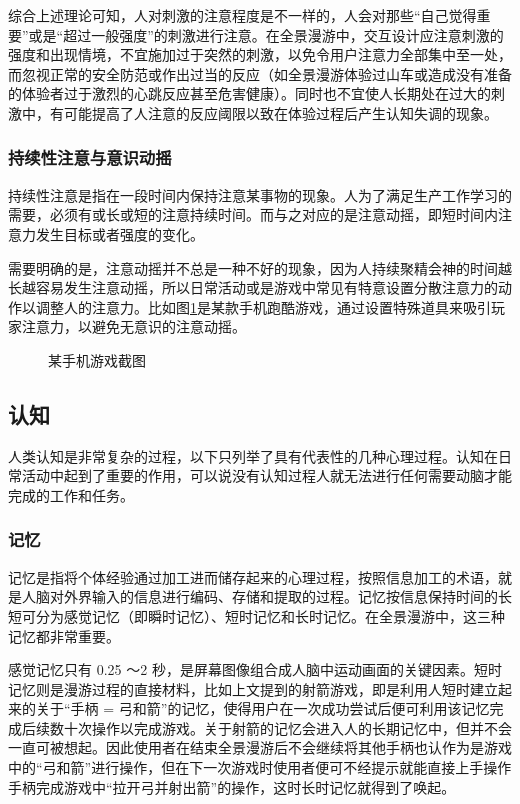 综合上述理论可知，人对刺激的注意程度是不一样的，人会对那些“自己觉得重要”或是“超过一般强度”的刺激进行注意。在全景漫游中，交互设计应注意刺激的强度和出现情境，不宜施加过于突然的刺激，以免令用户注意力全部集中至一处，而忽视正常的安全防范或作出过当的反应（如全景漫游体验过山车或造成没有准备的体验者过于激烈的心跳反应甚至危害健康）。同时也不宜使人长期处在过大的刺激中，有可能提高了人注意的反应阈限以致在体验过程后产生认知失调的现象。

\subsubsection{持续性注意与意识动摇}
持续性注意是指在一段时间内保持注意某事物的现象。人为了满足生产工作学习的需要，必须有或长或短的注意持续时间。而与之对应的是注意动摇，即短时间内注意力发生目标或者强度的变化。

需要明确的是，注意动摇并不总是一种不好的现象，因为人持续聚精会神的时间越长越容易发生注意动摇，所以日常活动或是游戏中常见有特意设置分散注意力的动作以调整人的注意力。比如图\ref{fig:magnet}是某款手机跑酷游戏，通过设置特殊道具来吸引玩家注意力，以避免无意识的注意动摇。

\begin{figure}[htp]
\centering
{}
\caption{某手机游戏截图}
\label{fig:magnet}
\end{figure}

\subsection{认知}
人类认知是非常复杂的过程，以下只列举了具有代表性的几种心理过程。认知在日常活动中起到了重要的作用，可以说没有认知过程人就无法进行任何需要动脑才能完成的工作和任务。

\subsubsection{记忆}
记忆是指将个体经验通过加工进而储存起来的心理过程，按照信息加工的术语，就是人脑对外界输入的信息进行编码、存储和提取的过程。记忆按信息保持时间的长短可分为感觉记忆（即瞬时记忆）、短时记忆和长时记忆。在全景漫游中，这三种记忆都非常重要。

感觉记忆只有 0.25
～2 秒，是屏幕图像组合成人脑中运动画面的关键因素。短时记忆则是漫游过程的直接材料，比如上文提到的射箭游戏，即是利用人短时建立起来的关于“手柄 = 弓和箭”的记忆，使得用户在一次成功尝试后便可利用该记忆完成后续数十次操作以完成游戏。关于射箭的记忆会进入人的长期记忆中，但并不会一直可被想起。因此使用者在结束全景漫游后不会继续将其他手柄也认作为是游戏中的“弓和箭”进行操作，但在下一次游戏时使用者便可不经提示就能直接上手操作手柄完成游戏中“拉开弓并射出箭”的操作，这时长时记忆就得到了唤起。

